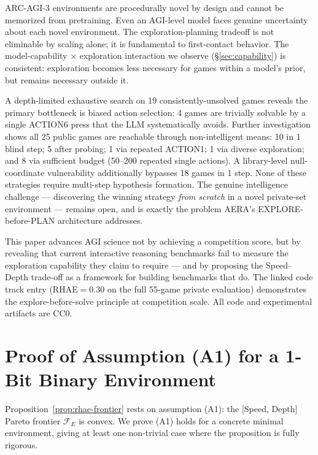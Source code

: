 \documentclass[11pt]{article}
\begin{document}
ARC-AGI-3 environments are procedurally novel by design and cannot be memorized from pretraining. Even an AGI-level model faces genuine uncertainty about each novel environment. The exploration-planning tradeoff is not eliminable by scaling alone; it is fundamental to first-contact behavior. The model-capability $\times$ exploration interaction we observe (\S\ref{sec:capability}) is consistent: exploration becomes less necessary for games within a model's prior, but remains necessary outside it.

A depth-limited exhaustive search on 19 consistently-unsolved games reveals the primary bottleneck is biased action selection: 4 games are trivially solvable by a single ACTION6 press that the LLM systematically avoids. Further investigation shows all 25 public games are reachable through non-intelligent means: 10 in 1 blind step; 5 after probing; 1 via repeated ACTION1; 1 via diverse exploration; and 8 via sufficient budget (50--200 repeated single actions). A library-level null-coordinate vulnerability additionally bypasses 18 games in 1 step. None of these strategies require multi-step hypothesis formation. The genuine intelligence challenge --- discovering the winning strategy \emph{from scratch} in a novel private-set environment --- remains open, and is exactly the problem AERA's EXPLORE-before-PLAN architecture addresses.

This paper advances AGI science not by achieving a competition score, but by revealing that current interactive reasoning benchmarks fail to measure the exploration capability they claim to require --- and by proposing the Speed--Depth trade-off as a framework for building benchmarks that do. The linked code track entry (RHAE$=$0.30 on the full 55-game private evaluation) demonstrates the explore-before-solve principle at competition scale. All code and experimental artifacts are CC0.

\appendix

\section{Proof of Assumption (A1) for a 1-Bit Binary Environment}
\label{sec:appendix}
\label{app:a1proof}

Proposition~\ref{prop:rhae-frontier} rests on assumption (A1): the [Speed, Depth] Pareto frontier $\mathcal{F}_E$ is convex. We prove (A1) holds for a concrete minimal environment, giving at least one non-trivial case where the proposition is fully rigorous.
\end{document}
